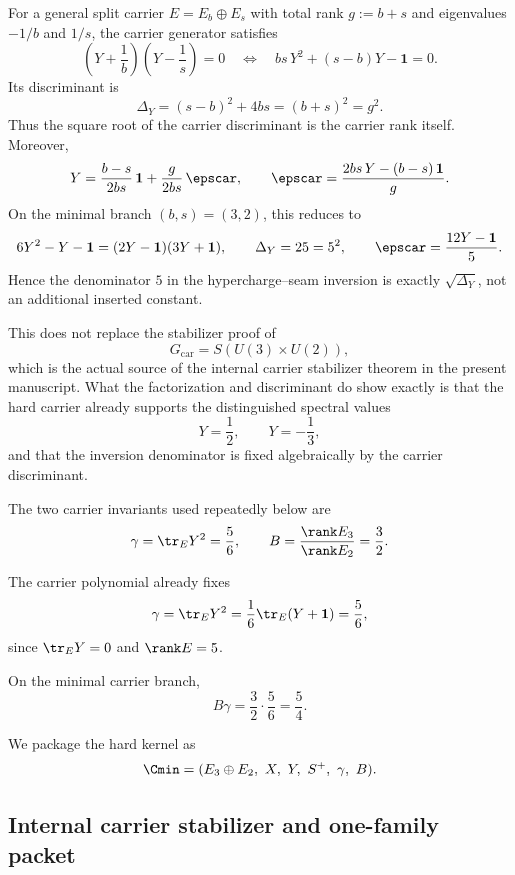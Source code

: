 
\begin{remark}\label{rem:carrier-discriminant}
For a general split carrier $E=E_b\oplus E_s$ with total rank $g:=b+s$ and eigenvalues $-1/b$ and $1/s$, the carrier generator satisfies
\[
\left(Y+\frac{1}{b}\right)\left(Y-\frac{1}{s}\right)=0
\quad\Longleftrightarrow\quad
bs\,Y^2+(s-b)Y-\mathbf 1=0.
\]
Its discriminant is
\[
\Delta_Y=(s-b)^2+4bs=(b+s)^2=g^2.
\]
Thus the square root of the carrier discriminant is the carrier rank itself. Moreover,
\[
Y=\frac{b-s}{2bs}\,\mathbf 1+\frac{g}{2bs}\,\epscar,
\qquad
\epscar=\frac{2bs\,Y-(b-s)\,\mathbf 1}{g}.
\]
On the minimal branch $(b,s)=(3,2)$, this reduces to
\[
6Y^2-Y-\mathbf 1=(2Y-\mathbf 1)(3Y+\mathbf 1),
\qquad
\Delta_Y=25=5^2,
\qquad
\epscar=\frac{12Y-\mathbf 1}{5}.
\]
Hence the denominator $5$ in the hypercharge--seam inversion is exactly $\sqrt{\Delta_Y}$, not an additional inserted constant.

This does not replace the stabilizer proof of
\[
G_{\mathrm{car}}=S(U(3)\times U(2)),
\]
which is the actual source of the internal carrier stabilizer theorem in the present manuscript.
What the factorization and discriminant do show exactly is that the hard carrier already supports the distinguished spectral values
\[
Y=\frac{1}{2},
\qquad
Y=-\frac{1}{3},
\]
and that the inversion denominator is fixed algebraically by the carrier discriminant.
\end{remark}

The two carrier invariants used repeatedly below are
\[
\gamma=\tr_EY^2=\frac56,
\qquad
B=\frac{\rank E_3}{\rank E_2}=\frac32.
\]
\begin{corollary}
The carrier polynomial already fixes
\[
\gamma=\tr_EY^2=\frac16\tr_E(Y+\mathbf 1)=\frac56,
\]
since $\tr_EY=0$ and $\rank E=5$.
\end{corollary}

\begin{corollary}
\label{cor:minimal-carrier-compression}
On the minimal carrier branch,
\[
B\gamma=\frac32\cdot\frac56=\frac54.
\]
\end{corollary}

We package the hard kernel as
\[
\Cmin=(E_3\oplus E_2,\ X,\ Y,\ S^+,\ \gamma,\ B).
\]

\subsection{Internal carrier stabilizer and one-family packet}

